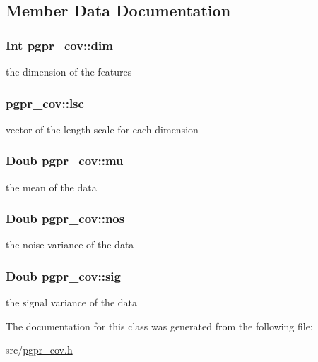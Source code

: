 \subsection{Member Data Documentation}
\hypertarget{classpgpr__cov_ab24ca5303c1a5e6865109a8e1ba32f0f}{
\subsubsection[{dim}]{\setlength{\rightskip}{0pt plus 5cm}Int pgpr\+\_\+cov\+::dim}}\label{classpgpr__cov_ab24ca5303c1a5e6865109a8e1ba32f0f}
the dimension of the features \hypertarget{classpgpr__cov_a43428fdb9c6278e5e2be3a4c60967b7b}{
\subsubsection[{lsc}]{ pgpr\+\_\+cov\+::lsc}}\label{classpgpr__cov_a43428fdb9c6278e5e2be3a4c60967b7b}
vector of the length scale for each dimension \hypertarget{classpgpr__cov_ad57517c36c587894616f19bd02025747}{
\subsubsection[{mu}]{\setlength{\rightskip}{0pt plus 5cm}Doub pgpr\+\_\+cov\+::mu}}\label{classpgpr__cov_ad57517c36c587894616f19bd02025747}
the mean of the data \hypertarget{classpgpr__cov_aca7d95563680510edbd84957b34da53c}{
\subsubsection[{nos}]{\setlength{\rightskip}{0pt plus 5cm}Doub pgpr\+\_\+cov\+::nos}}\label{classpgpr__cov_aca7d95563680510edbd84957b34da53c}
the noise variance of the data \hypertarget{classpgpr__cov_a57b97be1a56d01ba78bb58200cc66244}{
\subsubsection[{sig}]{\setlength{\rightskip}{0pt plus 5cm}Doub pgpr\+\_\+cov\+::sig}}\label{classpgpr__cov_a57b97be1a56d01ba78bb58200cc66244}
the signal variance of the data 

The documentation for this class was generated from the following file\+:\begin{DoxyCompactItemize}
\item 
src/\hyperlink{pgpr__cov_8h}{pgpr\+\_\+cov.\+h}\end{DoxyCompactItemize}
